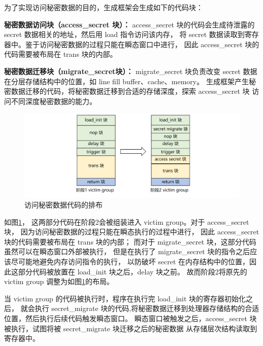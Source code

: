 为了实现访问秘密数据的目的，生成框架会生成如下的代码块：\par

\textbf{秘密数据访问块（access\_secret 块）：}
access\_secret 块的代码会生成待泄露的 secret 数据相关的地址，然后用 load 指令访问该内存，
将 secret 数据读取到寄存器中。鉴于访问秘密数据的过程只能在瞬态窗口中进行，
因此 access\_secret 块的代码需要被布局在 trans 块的内部。\par

\textbf{秘密数据迁移块（migrate\_secret块）：}
migrate\_secret 块负责改变 secret 数据在分层存储结构中的位置，如 line fill buffer、cache、memory。
生成框架产生秘密数据迁移的代码，将秘密数据迁移到合适的存储深度，探索 access\_secret 块
访问不同深度秘密数据的能力。\par

\begin{figure}[!h]
    \centering
    \includegraphics[width=\linewidth]{figure/paper/stage2-access-secret.png}
    \caption{访问秘密数据代码的排布}
    \label{paper:access-secret}
\end{figure}

如图\ref{paper:access-secret}，
这两部分代码在阶段2会被组装进入 victim group。对于 access\_secret 块，
因为访问秘密数据的过程只能在瞬态执行的过程中进行，
因此 access\_secret 块的代码需要被布局在 trans 块的内部；
而对于 migrate\_secret 块，这部分代码虽然可以在瞬态窗口外部被执行，
但是在执行了 migrate\_secret 块的指令之后应该尽可能地避免内存访问指令的执行，
以防破坏 secret 在内存结构中的位置，因此这部分代码被放置在 load\_init 块之后，delay 块之前。
故而阶段2将原先的 victim group 调整为如图\ref{paper:access-secret}的布局。\par

当 victim group 的代码被执行时，程序在执行完 load\_init 块的寄存器初始化之后，
就会执行 secret\_migrate 块的代码,将秘密数据迁移到处理器存储结构的合适位置，然后执行后续代码触发瞬态窗口。
瞬态窗口被触发之后，access\_secret 块被执行，试图将被 secret\_migrate 块迁移之后的秘密数据
从存储层次结构读取到寄存器中。\par


